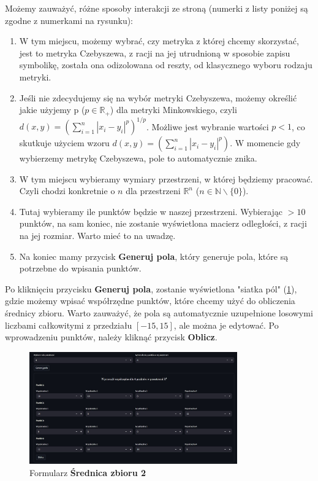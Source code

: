 \documentclass[article,11pt]{mwrep}
\newcommand{\R}{{\mathbb R}}
\newcommand{\N}{{\mathbb N}}
\begin{document}
Możemy zauważyć, różne sposoby interakcji ze stroną (numerki z listy poniżej są zgodne z numerkami na rysunku):
\begin{enumerate}
    \item W tym miejscu, możemy wybrać, czy metryka z której chcemy skorzystać, jest to metryka Czebyszewa, z racji na jej utrudnioną w sposobie zapisu symbolikę, została ona odizolowana od reszty, od klasycznego wyboru rodzaju metryki.
    \item Jeśli nie zdecydujemy się na wybór metryki Czebyszewa, możemy określić jakie użyjemy p ($p\in\R_+$) dla metryki Minkowskiego, czyli $d(x,y)=\left(\sum_{i=1}^n |x_i-y_i|^p\right)^{1/p}$. Możliwe jest wybranie wartości $p < 1$, co skutkuje użyciem wzoru $d(x,y)=\left(\sum_{i=1}^n |x_i-y_i|^p\right)$. W momencie gdy wybierzemy metrykę Czebyszewa, pole to automatycznie znika.
    \item W tym miejscu wybieramy wymiary przestrzeni, w której będziemy pracować. Czyli chodzi konkretnie o $n$ dla przestrzeni $\R^n$ ($n\in\N\backslash \{0\} $).
    \item Tutaj wybieramy ile punktów będzie w naszej przestrzeni. Wybierając $>10$ punktów, na sam koniec, nie zostanie wyświetlona macierz odległości, z racji na jej rozmiar. Warto mieć to na uwadzę.
    \item Na koniec mamy przycisk \textbf{Generuj pola}, który generuje pola, które są potrzebne do wpisania punktów.
\end{enumerate}

Po kliknięciu przycisku \textbf{Generuj pola}, zostanie wyświetlona "siatka pól" (\ref{rys:sp}), gdzie możemy wpisać współrzędne punktów, które chcemy użyć do obliczenia średnicy zbioru. Warto zauważyć, że pola są automatycznie uzupełnione losowymi liczbami całkowitymi z przedziału $[-15,15]$, ale można je edytować. Po wprowadzeniu punktów, należy kliknąć przycisk \textbf{Oblicz}.

\begin{figure}[H] 
    \centering
    \includegraphics[width=0.8\textwidth]{figure/Screenshot_3.jpg}
    \caption{Formularz \textbf{Średnica zbioru 2}}\label{rys:sp}
\end{figure}
\end{document}
